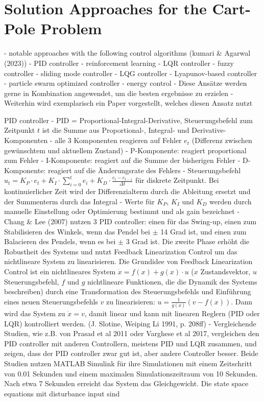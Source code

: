 \section{Solution Approaches for the Cart-Pole Problem}

- notable approaches with the following control algorithms (kumari & Agarwal (2023))
- PID controller
- reinforcement learning
- LQR controller
- fuzzy controller
- sliding mode controller
- LQG controller
- Lyapunov-based controller
- particle swarm optimized controller
- energy control
- Diese Ansätze werden gerne in Kombination angewendet, um die besten ergebnisse zu erzielen
- Weiterhin wird exemplarisch ein Paper vorgestellt, welches diesen Ansatz nutzt

PID controller
- PID = Proportional-Integral-Derivative, Steuerungsbefehl zum Zeitpunkt $t$ ist die Summe aus Proportional-, Integral- und Derivative-Komponenten
- alle 3 Komponenten reagieren auf Fehler $e_t$ (Differenz zwischen gewünschtem und aktuellem Zustand)
- P-Komponente: reagiert proportional zum Fehler
- I-Komponente: reagiert auf die Summe der bisherigen Fehler
- D-Komponente: reagiert auf die Änderungsrate des Fehlers
- Steuerungsbefehl $u_t = K_P\cdot e_t + K_I\cdot\sum_{i=0}^t e_i + K_D\cdot\frac{e_t - e_{t-1}}{\Delta t}$ für diskrete Zeitpunkt. Bei kontinuierlicher Zeit wird der Differenzialterm durch die Ableitung ersetzt und der Summenterm durch das Integral
- Werte für $K_P$, $K_I$ und $K_D$ werden durch manuelle Einstellung oder Optimierung bestimmt und als gain bezeichnet
- Chang & Lee (2007) nutzen 3 PID controller:  einen für das Swing-up, einen zum Stabilisieren des Winkels, wenn das Pendel bei $\pm$ 14 Grad ist, und einen zum Balacieren des Pendels, wenn es bei $\pm$ 3 Grad ist. Die zweite Phase erhöht die Robustheit des Systems und nutzt Feedback Linearization Control um das nichtlineare System zu linearisieren. Die Grundidee von Feedback Linearization Control ist ein nichtlineares System $\dot{x} = f(x) + g(x)\cdot u$ ($x$ Zustandsvektor, $u$ Steuerungsbefehl, $f$ und $g$ nichtlineare Funktionen, die die Dynamik des Systems beschreiben) durch eine Transformation des Steuerungsbefehls und Einführung eines neuen Steuerungsbefehls $v$ zu linearisieren: $u = \frac{1}{g(x)}(v - f(x))$. Dann wird das System zu $\dot{x}=v$, damit linear und kann mit linearen Reglern (PID oder LQR) kontrolliert werden. (J. Slotine, Weiping Li 1991, p. 208ff)
- Vergleichende Studien, wie z.B. von Prasad et al 2011 oder Varghese et al 2017, vergleichen den PID controller mit anderen Controllern, meistens PID und LQR zusammen, und zeigen, dass der PID controller zwar gut ist, aber andere Controller besser. Beide Studien nutzen MATLAB Simulink für ihre Simulationen mit einem Zeitschritt von 0.01 Sekunden und einem maximalen Simulationszeitraum von 10 Sekunden. Nach etwa 7 Sekunden erreicht das System das Gleichgewicht. Die state space equations mit disturbance input sind
